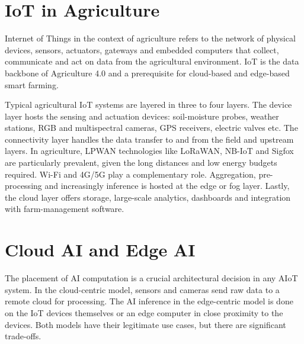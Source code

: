 \documentclass[12pt,a4paper]{report}
\begin{document}
\section{IoT in Agriculture}

Internet of Things in the context of agriculture refers to the network of physical devices, sensors, actuators, gateways and embedded computers that collect, communicate and act on data from the agricultural environment. IoT is the data backbone of Agriculture 4.0 and a prerequisite for cloud-based and edge-based smart farming.

Typical agricultural IoT systems are layered in three to four layers. The device layer hosts the sensing and actuation devices: soil-moisture probes, weather stations, RGB and multispectral cameras, GPS receivers, electric valves etc. The connectivity layer handles the data transfer to and from the field and upstream layers. In agriculture, LPWAN technologies like LoRaWAN, NB-IoT and Sigfox are particularly prevalent, given the long distances and low energy budgets required. Wi-Fi and 4G/5G play a complementary role. Aggregation, pre-processing and increasingly inference is hosted at the edge or fog layer. Lastly, the cloud layer offers storage, large-scale analytics, dashboards and integration with farm-management software.

\section{Cloud AI and Edge AI}

The placement of AI computation is a crucial architectural decision in any AIoT system. In the cloud-centric model, sensors and cameras send raw data to a remote cloud for processing. The AI inference in the edge-centric model is done on the IoT devices themselves or an edge computer in close proximity to the devices. Both models have their legitimate use cases, but there are significant trade-offs.
\end{document}
